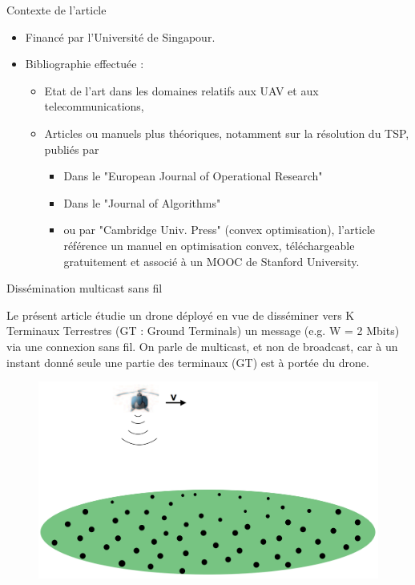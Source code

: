 \begin{frame}{Contexte de l'article}
\begin{itemize}
	\item Financé par l'Université de Singapour.

	\item Bibliographie effectuée : 
	\begin{itemize}
		\item Etat de l'art dans les domaines relatifs aux UAV et aux telecommunications, 
		\item Articles ou manuels plus théoriques, notamment sur la résolution du TSP, publiés par 
 			\begin{itemize}
 				\item  Dans le "European Journal of Operational Research"
 				\item  Dans le "Journal of Algorithms"
 				\item  ou par "Cambridge Univ. Press" (convex optimisation), l'article référence un manuel
 				en optimisation convex, téléchargeable gratuitement et associé à un MOOC de Stanford University.
 			\end{itemize}
	\end{itemize}


\end{itemize}
\end{frame}
 
\begin{frame}{Dissémination multicast sans fil}

Le présent article étudie un drone déployé en vue de disséminer vers K Terminaux Terrestres (GT : Ground Terminals) un message (e.g. W = 2 Mbits) via une connexion sans fil. On parle de multicast, et non de broadcast, car à un instant donné seule une partie des terminaux (GT) est à portée du drone.

\begin{figure}
	\centering
	\includegraphics[width=0.7\linewidth]{images/multicast}
	\caption{}
	\label{fig:multicast}
\end{figure}

\end{frame}

